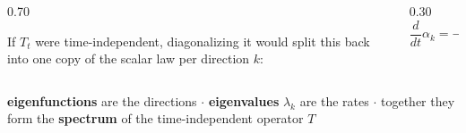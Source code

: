 \documentclass[aspectratio=169,9pt]{beamer}
\begin{document}
\begin{frame}
	\vspace{1.5mm}
	\pause
	\begin{whitecard}
		\begin{columns}[c,onlytextwidth]
			\begin{column}{0.70\textwidth}
				\centering
				{\scriptsize\raggedright If $T_t$ were time-independent, diagonalizing it
					would split this back into one copy of the scalar law per
					direction \(k\):\par}
			\end{column}
			\begin{column}{0.30\textwidth}
				\vspace{-1.5mm}
				\[ \frac{d}{dt}\alpha_k = -\lambda_k\,\alpha_k \]
				\vspace{-4mm}
			\end{column}
		\end{columns}
		\vspace{1.5mm}
		{\centering\scriptsize
		{\bfseries eigenfunctions} are the directions
		\;\textcolor{muted}{$\cdot$}\;
		{\bfseries eigenvalues} $\lambda_k$ are the rates
		\;\textcolor{muted}{$\cdot$}\;
		together they form the {\bfseries spectrum} of the time-independent operator $T$\par}
	\end{whitecard}

	\centering
	\vspace{1mm}
	\pause
	\begin{bluecard}[width=0.6\linewidth]
	\end{bluecard}
\end{frame}
\end{document}
